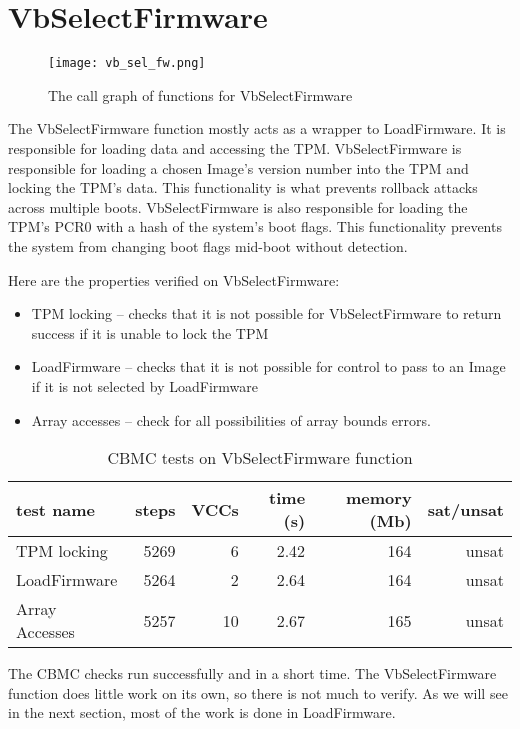 \section{VbSelectFirmware}

\begin{figure}[!htbp]
  \centering
  \texttt{[image: vb\_sel\_fw.png]}
  \caption[VbSelectFirmware Call Graph]{The call graph of functions for VbSelectFirmware}\label{fig:vbselfw}
\end{figure}

The VbSelectFirmware function mostly acts as a wrapper to LoadFirmware.
It is responsible for loading data and accessing the TPM\@.
VbSelectFirmware is responsible for loading a chosen Image's version number into the TPM and locking the TPM's data. 
This functionality is what prevents rollback attacks across multiple boots.
VbSelectFirmware is also responsible for loading the TPM's PCR0 with a hash of the system's boot flags.
This functionality prevents the system from changing boot flags mid-boot without detection.  

Here are the properties verified on VbSelectFirmware:
\begin{itemize}
 \item  TPM locking -- checks that it is not possible for VbSelectFirmware to return success if it is unable to lock the TPM
 \item  LoadFirmware -- checks that it is not possible for control to pass to an Image if it is not selected by LoadFirmware
 \item  Array accesses -- check for all possibilities of array bounds errors.
\end{itemize}

\begin{table}[!htbp]
    \centering
    \caption{CBMC tests on VbSelectFirmware function}\label{sfw_results}
    \begin{tabular}{lrrrrr}
        \toprule
        test name & steps & VCCs & time (s) & memory (Mb) & sat/unsat  \\ \midrule
        TPM locking & 5269 & 6 & 2.42 & 164 & unsat \\
        LoadFirmware & 5264 & 2 & 2.64 & 164 & unsat \\
        Array Accesses & 5257 & 10 & 2.67 & 165 &  unsat \\\bottomrule
    \end{tabular}
\end{table}

The CBMC checks run successfully and in a short time.
The VbSelectFirmware function does little work on its own, so there is not much to verify.
As we will see in the next section, most of the work is done in LoadFirmware. 

